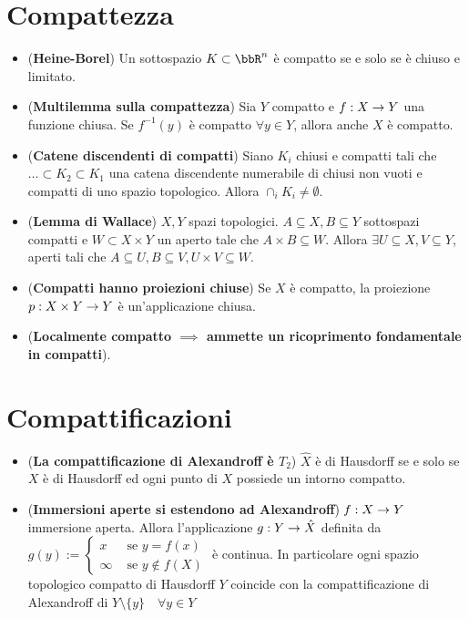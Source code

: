\documentclass[a4paper,NoNotes,GeneralMath]{stdmdoc}
\begin{document}
	\section*{Compattezza}
	\begin{itemize}
		\item ({\bf Heine-Borel}) Un sottospazio $K \subset \bbR^n$ è compatto se e solo se è chiuso e limitato.
		\item ({\bf Multilemma sulla compattezza}) Sia $Y$ compatto e $f: X \rightarrow Y$ una funzione chiusa. Se $f^{-1}(y)$ è compatto $\forall y \in Y$, allora anche $X$ è compatto.
		\item ({\bf Catene discendenti di compatti}) Siano $K_i$ chiusi e compatti tali che $\ldots \subset K_2 \subset K_1$ una catena discendente numerabile di chiusi non vuoti e compatti di uno spazio topologico. Allora $\cap_i K_i \neq \emptyset$.
		\item ({\bf Lemma di Wallace}) $X,Y$ spazi topologici. $A \subseteq X, B \subseteq Y$ sottospazi compatti e $W \subset X \times Y$ un aperto tale che $A \times B \subseteq W$. Allora $\exists U \subseteq X, V \subseteq Y$, aperti tali che $A \subseteq U, B \subseteq V, U\times V \subseteq W$.
		\item ({\bf Compatti hanno proiezioni chiuse}) Se $X$ è compatto, la proiezione $p: X \times Y \rightarrow Y$ è un'applicazione chiusa.
		\item ({\bf Localmente compatto $\implies$ ammette un ricoprimento fondamentale in compatti}).
	\end{itemize}

	\section*{Compattificazioni}
	\begin{itemize}
		\item ({\bf La compattificazione di Alexandroff è $T_2$}) $\hat{X}$ è di Hausdorff se e solo se $X$ è di Hausdorff ed ogni punto di $X$ possiede un intorno compatto.
		\item ({\bf Immersioni aperte si estendono ad Alexandroff}) $f: X \rightarrow Y$ immersione aperta. Allora l'applicazione $g: Y \rightarrow \hat{X}$ definita da $g(y) := \left\{ \begin{array}{cr} x & \text{ se } y = f(x) \\ \infty & \text{ se } y \notin f(X) \end{array} \right.$ è continua. In particolare ogni spazio topologico compatto di Hausdorff $Y$ coincide con la compattificazione di Alexandroff di $Y \setminus \{y\} \quad \forall y \in Y$ 
	\end{itemize}
	
\end{document}
